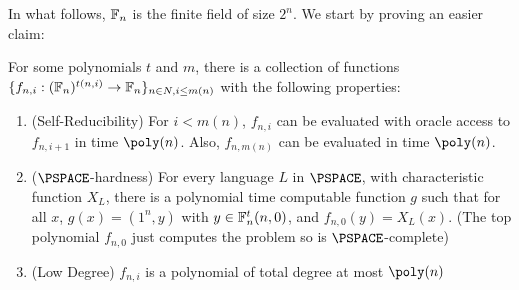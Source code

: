 In what follows, $\mathbb{F}_n$ is the finite field of size $2^n$. We start by proving an easier claim:
\begin{claim}\label{clm:USR-func-fam}
	For some polynomials $t$ and $m$, there is a collection of functions \\ $\{f_{n,i} : (\mathbb{F}_n)^{t(n,i)} \rightarrow \mathbb{F}_n\}_{n \in N,i \leq m(n)}$ with the following properties:
	\begin{enumerate}
		\item (Self-Reducibility) For $i < m(n)$, $f_{n,i}$ can be evaluated with oracle access	to $f_{n,i+1}$ in time $\poly(n)$. Also, $f_{n,m(n)}$ can be evaluated in time $\poly(n)$.
		\item ($\PSPACE$-hardness)  For every language $L$ in $\PSPACE$, with characteristic function $X_L$, there is a polynomial time computable function $g$ such that for all $x$, $g(x) = (1^n, y)$ with $y \in \mathbb{F}_n^t(n,0)$, and $f_{n,0}(y) = X_L(x)$. (The top polynomial $f_{n,0}$ just computes the problem so is $\PSPACE$-complete)
		\item (Low Degree) $f_{n,i}$ is a polynomial of total degree at most $\poly(n)$
	\end{enumerate}
\end{claim}

